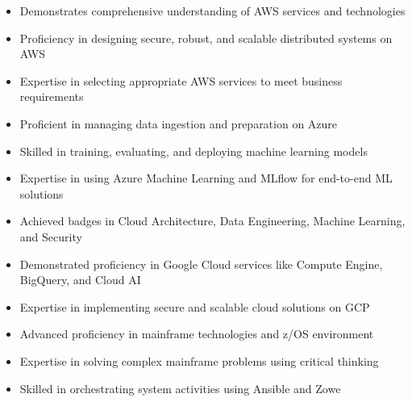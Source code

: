 




\begin{itemize}
	\item Demonstrates comprehensive understanding of AWS services and technologies
	\item Proficiency in designing secure, robust, and scalable distributed systems on AWS
	\item Expertise in selecting appropriate AWS services to meet business requirements
\end{itemize}
\smallskip
\smallskip
{}
\begin{itemize}
	\item Proficient in managing data ingestion and preparation on Azure
	\item Skilled in training, evaluating, and deploying machine learning models
	\item Expertise in using Azure Machine Learning and MLflow for end-to-end ML solutions
\end{itemize}
\smallskip
\smallskip
{}
\begin{itemize}
	\item Achieved badges in Cloud Architecture, Data Engineering, Machine Learning, and Security
	\item Demonstrated proficiency in Google Cloud services like Compute Engine, BigQuery, and Cloud AI
	\item Expertise in implementing secure and scalable cloud solutions on GCP
\end{itemize}
\smallskip
\smallskip
{}
\begin{itemize}
	\item Advanced proficiency in mainframe technologies and z/OS environment
	\item Expertise in solving complex mainframe problems using critical thinking
	\item Skilled in orchestrating system activities using Ansible and Zowe
\end{itemize}
\smallskip
\smallskip

{}
